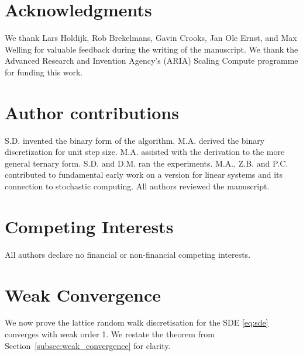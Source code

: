 \documentclass[pra,showpacs,amsmath,amssymb,amsfonts,lengthcheck,longbibliography,onecolumn]{revtex4-2}
\begin{document}



\section*{Acknowledgments}

We thank Lars Holdijk, Rob Brekelmans, Gavin Crooks, Jan Ole Ernst, and Max Welling for valuable feedback during the writing of the manuscript. We thank the Advanced Research and Invention Agency’s (ARIA) Scaling Compute programme for funding this work.

\section*{Author contributions}
S.D. invented the binary form of the algorithm. M.A. derived the binary discretization for unit step size. M.A. assisted with the derivation to the more general ternary form. S.D. and D.M. ran the experiments. M.A., Z.B. and P.C. contributed to fundamental early work on a version for linear systems and its connection to stochastic computing. All authors reviewed the manuscript.

\section*{Competing Interests}
All authors declare no financial or non-financial competing interests. 


\appendix

\section{Weak Convergence}\label{sec:weakproof}


We now prove the lattice random walk discretisation for the SDE \eqref{eq:sde} converges with weak order 1. We restate the theorem from Section~\ref{subsec:weak_convergence} for clarity.
\end{document}
